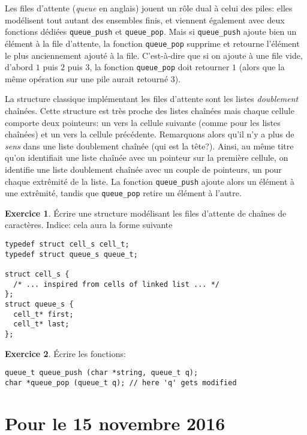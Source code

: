 \documentclass[french,a4paper]{article}
\theoremstyle{definition}
\newtheorem{exercise}{Exercice}
\theoremstyle{remark}
\newcommand{\inlinec}[1]{\lstinline[style=C]°#1°}
\begin{document}
\medskip

Les files d'attente ({\em queue} en anglais) jouent un rôle dual à
celui des piles: elles modélisent tout autant des ensembles finis, et
viennent également avec deux fonctions dédiées \inlinec{queue_push} et
\inlinec{queue_pop}. Mais si \inlinec{queue_push} ajoute bien un
élément à la file d'attente, la fonction \inlinec{queue_pop} supprime
et retourne l'élément le plus anciennement ajouté à la
file. C'est-à-dire que si on ajoute à une file vide, d'abord $1$ puis
$2$ puis $3$, la fonction \inlinec{queue_pop} doit retourner $1$
(alors que la même opération sur une pile aurait retourné $3$).

La structure classique implémentant les files d'attente sont les
listes {\em doublement} chaînées. Cette structure est très proche des
listes chaînées mais chaque cellule comporte deux pointeurs: un vers
la cellule suivante (comme pour les listes chaînées) et un vers la
cellule précédente. Remarquons alors qu'il n'y a plus de {\em sens}
dans une liste doublement chaînée (qui est la tête?). Ainsi, au même
titre qu'on identifiait une liste chaînée avec un pointeur sur la
première cellule, on identifie une liste doublement chaînée avec un
couple de pointeurs, un pour chaque extrêmité de la liste. La fonction
\inlinec{queue_push} ajoute alors un élément à une extrêmité, tandis
que \inlinec{queue_pop} retire un élément à l'autre.

\begin{exercise}
  \'Ecrire une structure modélisant les files d'attente de
  chaînes de caractères. Indice: cela aura la forme suivante
  \begin{lstlisting}
typedef struct cell_s cell_t;
typedef struct queue_s queue_t;

struct cell_s {
  /* ... inspired from cells of linked list ... */
};
struct queue_s {
  cell_t* first;
  cell_t* last;
};
  \end{lstlisting}
\end{exercise}

\begin{exercise}
  \'Ecrire les fonctions:
  \begin{lstlisting}
queue_t queue_push (char *string, queue_t q);
char *queue_pop (queue_t q); // here 'q' gets modified
  \end{lstlisting}
\end{exercise}

\section{Pour le 15 novembre 2016}
\label{sec:homeworks}
\end{document}

